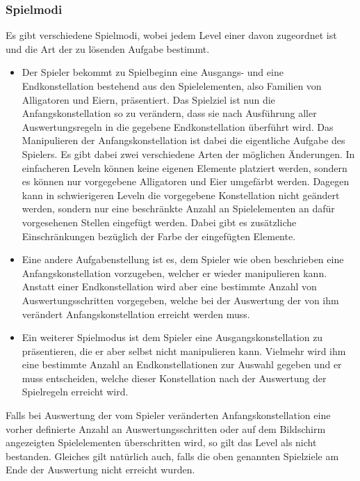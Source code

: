 \subsubsection{Spielmodi}
Es gibt verschiedene Spielmodi, wobei jedem Level einer davon zugeordnet ist und die Art der zu lösenden Aufgabe bestimmt.
	\begin{itemize}
		\item Der Spieler bekommt zu Spielbeginn eine Ausgangs- und eine Endkonstellation bestehend aus den Spielelementen, also Familien von Alligatoren und Eiern, präsentiert.
		Das Spielziel ist nun die Anfangskonstellation so zu verändern, dass sie nach Ausführung aller Auswertungsregeln in die gegebene Endkonstellation überführt wird.
		Das Manipulieren der Anfangskonstellation ist dabei die eigentliche Aufgabe des Spielers.
		Es gibt dabei zwei verschiedene Arten der möglichen Änderungen.
		In einfacheren Leveln können keine eigenen Elemente platziert werden, sondern es können nur vorgegebene Alligatoren und Eier umgefärbt werden.
		Dagegen kann in schwierigeren Leveln die vorgegebene Konstellation nicht geändert werden, sondern nur eine beschränkte Anzahl an Spielelementen an dafür vorgesehenen Stellen eingefügt werden.
		Dabei gibt es zusätzliche Einschränkungen bezüglich der Farbe der eingefügten Elemente.

		\item Eine andere Aufgabenstellung ist es, dem Spieler wie oben beschrieben eine Anfangskonstellation vorzugeben, welcher er wieder manipulieren kann.
		Anstatt einer Endkonstellation wird aber eine bestimmte Anzahl von Auswertungsschritten vorgegeben, welche bei der Auswertung der von ihm verändert Anfangskonstellation erreicht werden muss.

		\item Ein weiterer Spielmodus ist dem Spieler eine Ausgangskonstellation zu präsentieren, die er aber selbst nicht manipulieren kann.
		Vielmehr wird ihm eine bestimmte Anzahl an Endkonstellationen zur Auswahl gegeben und er muss entscheiden, welche dieser Konstellation nach der Auswertung der Spielregeln erreicht wird.

	\end{itemize}

	Falls bei Auswertung der vom Spieler veränderten Anfangskonstellation eine vorher definierte Anzahl an Auswertungsschritten oder auf dem Bildschirm angezeigten Spielelementen überschritten wird, so gilt das Level als nicht bestanden.
	Gleiches gilt natürlich auch, falls die oben genannten Spielziele am Ende der Auswertung nicht erreicht wurden.



